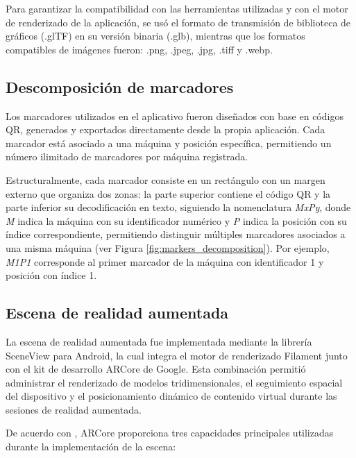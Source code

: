         Para garantizar la compatibilidad con las herramientas utilizadas y con el motor de renderizado de la aplicación, se usó el formato de transmisión de biblioteca de gráficos (.glTF) en su versión binaria (.glb), mientras que los formatos compatibles de imágenes fueron: .png, .jpeg, .jpg, .tiff y .webp.

    \subsection{Descomposición de marcadores}

        Los marcadores utilizados en el aplicativo fueron diseñados con base en códigos QR, generados y exportados directamente desde la propia aplicación. Cada marcador está asociado a una máquina y posición específica, permitiendo un número ilimitado de marcadores por máquina registrada.

        Estructuralmente, cada marcador consiste en un rectángulo con un margen externo que organiza dos zonas: la parte superior contiene el código QR y la parte inferior su decodificación en texto, siguiendo la nomenclatura \textit{MxPy}, donde \textit{M} indica la máquina con su identificador numérico y \textit{P} indica la posición con su índice correspondiente, permitiendo distinguir múltiples marcadores asociados a una misma máquina (ver Figura \ref{fig:markers_decomposition}). Por ejemplo, \textit{M1P1} corresponde al primer marcador de la máquina con identificador 1 y posición con índice 1.

        

    \subsection{Escena de realidad aumentada}

        La escena de realidad aumentada fue implementada mediante la librería SceneView para Android, la cual integra el motor de renderizado Filament junto con el kit de desarrollo ARCore de Google. Esta combinación permitió administrar el renderizado de modelos tridimensionales, el seguimiento espacial del dispositivo y el posicionamiento dinámico de contenido virtual durante las sesiones de realidad aumentada.

        De acuerdo con \textcite{GOOGLE:2025}, ARCore proporciona tres capacidades principales utilizadas durante la implementación de la escena:

